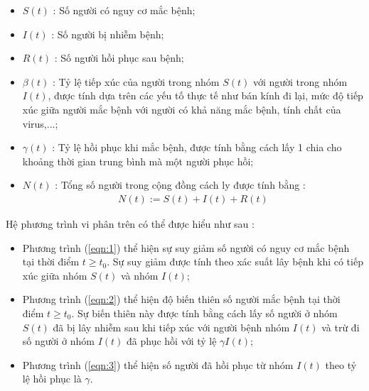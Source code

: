 \documentclass[a4paper]{article}
\begin{document}
	\begin{itemize}
	\item $S(t)$ : Số người có nguy cơ mắc bệnh;
	\item $I(t)$ : Số người bị nhiễm bệnh;
	\item $R(t)$ : Số người hồi phục sau bệnh;
	\item $\beta(t)$ : Tỷ lệ tiếp xúc của người trong nhóm $S(t)$ với người trong nhóm $I(t)$, được tính dựa trên các yếu tố thực tế như bán kính đi lại, mức độ tiếp xúc giữa người mắc bệnh với người có khả năng mắc bệnh, tính chất của virus,...;
	\item $\gamma(t)$ : Tỷ lệ hồi phục khi mắc bệnh, được tính bằng cách lấy 1 chia cho khoảng thời gian trung bình mà một người phục hồi;
	\item $N(t)$ : Tổng số người trong cộng đồng cách ly được tính bằng :
	\begin{align} 
		\label{eqn:4}
		N(t) := S(t) + I(t) + R(t)
	\end{align}
	\end{itemize}

Hệ phương trình vi phân trên có thể được hiểu như sau :
	\begin{itemize} 
	\item Phương trình (\ref{eqn:1}) thể hiện sự suy giảm số người có nguy cơ mắc bệnh tại thời điểm $t \geq t_0$. Sự suy giảm được tính theo xác suất lây bệnh khi có tiếp xúc giữa nhóm $S(t)$ và nhóm $I(t)$;
	\item Phương trình (\ref{eqn:2}) thể hiện độ biến thiên số người mắc bệnh tại thời điểm $t \geq t_0$. Sự biến thiên này được tính bằng cách lấy số người ở nhóm $S(t)$ đã bị lây nhiễm sau khi tiếp xúc với người bệnh nhóm $I(t)$ và trừ đi số người ở nhóm $I(t)$ đã phục hồi với tỷ lệ $\gamma I(t)$;
	\item Phương trình (\ref{eqn:3}) thể hiện số người đã hồi phục từ nhóm $I(t)$ theo tỷ lệ hồi phục là $\gamma$.
	\end{itemize}	
	
\end{document}
